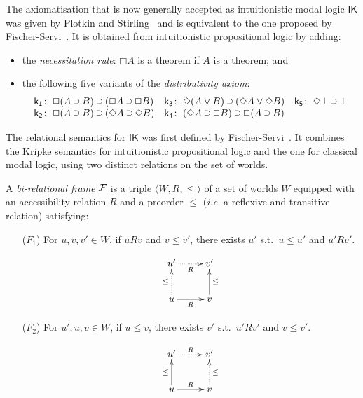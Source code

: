 \documentclass[twoside]{aiml18}
\newcommand*{\ax}[1]{\mathsf{#1}}
\newcommand*{\kax}[1][]		{\ax{k_{#1}}}
\newcommand*{\IK}{\mathsf{IK}}
\newcommand*{\OR}{\mathbin{\vee}}
\newcommand*{\BOT}{\mathord{\bot}}
\newcommand*{\IMP}{\mathbin{\scalebox{.9}{\raise.2ex\hbox{$\supset$}}}}
\newcommand*{\BOX}{\mathord{\Box}}
\newcommand*{\DIA}{\mathord{\Diamond}}
\newcommand*{\rel}{R}
\begin{document}
The axiomatisation that is now generally accepted as intuitionistic modal logic $\IK$ was given by Plotkin and Stirling~\cite{Plotkin} and is equivalent to the one proposed by Fischer-Servi~\cite{Fischer}.
%
It is obtained from intuitionistic propositional logic by adding:
\begin{itemize}
\item the \emph{necessitation rule}: $\BOX A$ is a theorem if $A$ is a theorem; and
\item the following five variants of the \emph{distributivity axiom}:
\begin{equation*}
\label{eq:ik}%
\begin{array}[t]{r@{\;}l@{\quad}r@{\;}l@{\quad}r@{\;}l}
\kax[1]\colon&\BOX(A\IMP B)\IMP(\BOX A\IMP\BOX B)
&
\kax[3]\colon&\DIA(A\OR B)\IMP(\DIA A\OR\DIA B)
&
\kax[5]\colon&\DIA\BOT\IMP\BOT
\\
\kax[2]\colon&\BOX(A\IMP B)\IMP(\DIA A\IMP\DIA B)
&
\kax[4]\colon&(\DIA A\IMP \BOX B)\IMP\BOX(A\IMP B)\\%
\end{array}
\end{equation*}
\end{itemize}

The relational semantics for $\IK$ was first defined by Fischer-Servi~\cite{Fischer}.
%
It combines the Kripke semantics for intuitionistic propositional logic and the one for classical modal logic, using two distinct relations on the set of worlds.

\begin{definition}
	A \emph{bi-relational frame} $\mathcal{F}$ is a triple $\langle W, R, \le \rangle$ 
	of a set of worlds $W$ equipped with an {accessibility relation} $\rel$ and a preorder $\le$ (\emph{i.e.} a reflexive and transitive relation) satisfying:
	\begin{enumerate}
		\item[($F_1$)] For $u, v, v' \in W$, if $u \rel v$ and $v \le v'$, there exists $u'$ s.t.~$u \le u'$ and $u' \rel v'$.
		
			\begin{equation*}
			\xymatrix{
				u' \ar@{.>}[r]_R  & v' \\
				u \ar@{.>}[u]^{\le} \ar@{->}[r]_R  & v \ar@{->}[u]_{\le}
			}
			\end{equation*}
		
		\item[($F_2$)] For $u', u, v \in W$, if $u \le v$, there exists $v'$ s.t.~$u' \rel v'$ and $v\le v'$.
		
			\begin{equation*}
			\xymatrix{
				u' \ar@{.>}[r]^R & v' \\
				u \ar@{->}[u]^{\le} \ar@{->}[r]^R & v \ar@{.>}[u]_{\le}
			}
			\end{equation*}
	\end{enumerate}
%	
\end{definition}
\end{document}
